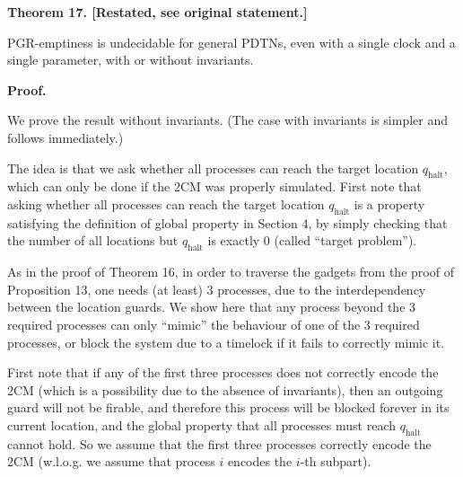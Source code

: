 \documentclass[10pt,a4paper]{article}
\begin{document}
\par\medskip\noindent\textbf{Theorem 17. [Restated, see original statement.]}\par
 
 
PGR-emptiness is undecidable for general PDTNs, even with a single clock and a single parameter, with or without invariants.\par
 
 
 
 
 
\par\medskip\noindent\textbf{Proof.}\par
 
 
We prove the result without invariants. (The case with invariants is simpler and follows immediately.)\par
 
 
 
The idea is that we ask whether all processes can reach the target location $q_{\textrm{halt}}$, which can only be done if the 2CM was properly simulated. First note that asking whether all processes can reach the target location $q_{\textrm{halt}}$ is a property satisfying the definition of global property in Section 4, by simply checking that the number of all locations but $q_{\textrm{halt}}$ is exactly 0 (called “target problem”).\par
 
 
 
As in the proof of Theorem 16, in order to traverse the gadgets from the proof of Proposition 13, one needs (at least) 3 processes, due to the interdependency between the location guards. We show here that any process beyond the 3 required processes can only “mimic” the behaviour of one of the 3 required processes, or block the system due to a timelock if it fails to correctly mimic it.\par
 
 
 
First note that if any of the first three processes does not correctly encode the 2CM (which is a possibility due to the absence of invariants), then an outgoing guard will not be firable, and therefore this process will be blocked forever in its current location, and the global property that all processes must reach $q_{\textrm{halt}}$ cannot hold. So we assume that the first three processes correctly encode the 2CM (w.l.o.g. we assume that process $i$ encodes the $i$-th subpart).\par
 
\end{document}
